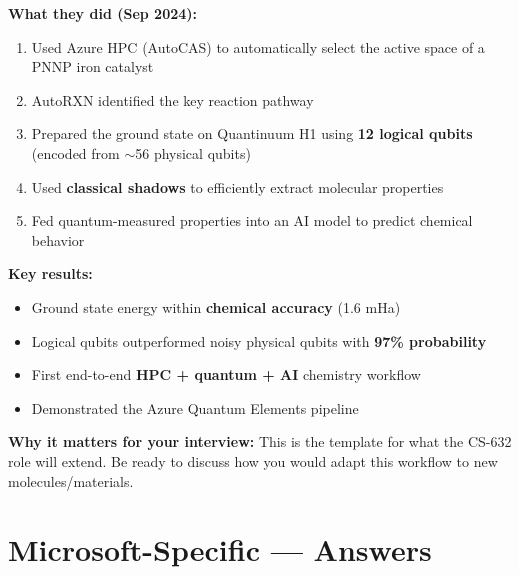 \documentclass[11pt,a4paper]{article}
\begin{document}
\begin{answerbox}
\textbf{What they did (Sep 2024):}
\begin{enumerate}
    \item Used Azure HPC (AutoCAS) to automatically select the active space of a PNNP iron catalyst
    \item AutoRXN identified the key reaction pathway
    \item Prepared the ground state on Quantinuum H1 using \textbf{12 logical qubits} (encoded from $\sim$56 physical qubits)
    \item Used \textbf{classical shadows} to efficiently extract molecular properties
    \item Fed quantum-measured properties into an AI model to predict chemical behavior
\end{enumerate}
\textbf{Key results:}
\begin{itemize}
    \item Ground state energy within \textbf{chemical accuracy} (1.6 mHa)
    \item Logical qubits outperformed noisy physical qubits with \textbf{97\% probability}
    \item First end-to-end \textbf{HPC + quantum + AI} chemistry workflow
    \item Demonstrated the Azure Quantum Elements pipeline
\end{itemize}
\textbf{Why it matters for your interview:} This is the template for what the CS-632 role will extend. Be ready to discuss how you would adapt this workflow to new molecules/materials.
\end{answerbox}


\section{Microsoft-Specific --- Answers}
\end{document}
